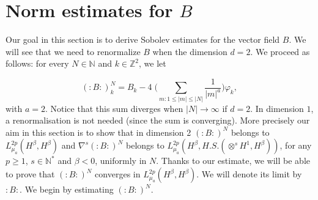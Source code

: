 \documentclass[11pt,leqno]{amsart}
\newcommand{\N}{\mathbb{N}}
\begin{document}
\section{Norm estimates for $B$ }  \label{estim-B}  


Our goal in this section is to derive Sobolev estimates for the vector field $B$. 
We will see that we need to renormalize $B$ when the dimension $d=2$. We proceed as follows: for every $N\in \N$  and $k\in {\mathbb Z}^2$, we let

\begin{equation} 	\label{:B:}
(:B:)_k^N= B_k - 4 \; \Big(\sum_{m:1\leq |m| \leq |N|} \frac{1}{|m|^a}\Big) \varphi_k,
\end{equation}
with $a=2$. Notice that this sum diverges when $|N| \rightarrow \infty$ if $d=2$. In dimension $1$, a renormalisation is not needed (since the sum is converging).
 More precisely our aim in this section is to show that in dimension 2 $(:B:)^N$ belongs to $ L^{2p}_{\mu_a} (H^\beta , H^\beta)$ and $\nabla^{s}( :B:)^N$ 
 belongs to $L^{2p}_{\mu_a} (H^\beta , H.S. (\otimes^{s} H^1 ,H^\beta))$, for any $p\geq 1$, $s\in \N^\ast$ and $\beta <0$, uniformly in $N$.
  Thanks to our estimate, we will be able to prove that $(:B:)^N$ converges in $ L^{2p}_{\mu_a} (H^\beta , H^\beta)$. We will denote its limit by $:B:$. We begin by estimating $(:B:)^N$.
\end{document}

